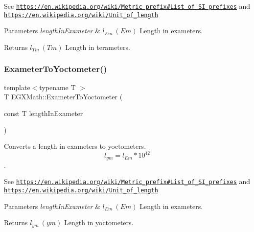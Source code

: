 See \href{https://en.wikipedia.org/wiki/Metric_prefix#List_of_SI_prefixes}{\tt https\+://en.\+wikipedia.\+org/wiki/\+Metric\+\_\+prefix\#\+List\+\_\+of\+\_\+\+S\+I\+\_\+prefixes} and \href{https://en.wikipedia.org/wiki/Unit_of_length}{\tt https\+://en.\+wikipedia.\+org/wiki/\+Unit\+\_\+of\+\_\+length} 
\begin{DoxyParams}{Parameters}
{\em length\+In\+Exameter} & $ l_{Em}\ (Em)$ Length in exameters. \\
\hline
\end{DoxyParams}
\begin{DoxyReturn}{Returns}
$ l_{Tm}\ (Tm)$ Length in terameters. 
\end{DoxyReturn}
\mbox{\label{group___e_g_x_math-_conversions-_length_conversions-_s_i-_exameter-_s_i_ga0da838a3aa4a2f6ee53687aa346f80ef}} 
\subsubsection{\texorpdfstring{Exameter\+To\+Yoctometer()}{ExameterToYoctometer()}}
{\footnotesize\ttfamily template$<$typename T $>$ \\
T E\+G\+X\+Math\+::\+Exameter\+To\+Yoctometer (\begin{DoxyParamCaption}\item[{const T}]{length\+In\+Exameter }\end{DoxyParamCaption})}



Converts a length in exameters to yoctometers. \[ l_{ym}=l_{Em} * 10^{42} \]. 

See \href{https://en.wikipedia.org/wiki/Metric_prefix#List_of_SI_prefixes}{\tt https\+://en.\+wikipedia.\+org/wiki/\+Metric\+\_\+prefix\#\+List\+\_\+of\+\_\+\+S\+I\+\_\+prefixes} and \href{https://en.wikipedia.org/wiki/Unit_of_length}{\tt https\+://en.\+wikipedia.\+org/wiki/\+Unit\+\_\+of\+\_\+length} 
\begin{DoxyParams}{Parameters}
{\em length\+In\+Exameter} & $ l_{Em}\ (Em)$ Length in exameters. \\
\hline
\end{DoxyParams}
\begin{DoxyReturn}{Returns}
$ l_{ym}\ (ym)$ Length in yoctometers. 
\end{DoxyReturn}
\mbox{\label{group___e_g_x_math-_conversions-_length_conversions-_s_i-_exameter-_s_i_ga052b009f7705d8ad81083116d15dec65}} 
